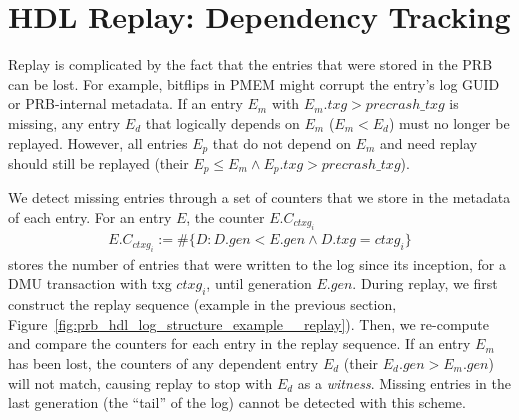 \documentclass[12pt,a4paper,twoside]{book}
\begin{document}
\section{HDL Replay: Dependency Tracking}\label{di:prb:deptrack}
Replay is complicated by the fact that the entries that were stored in the PRB can be lost.
For example, bitflips in PMEM might corrupt the entry's log GUID or PRB-internal metadata.
If an entry $E_m$ with $E_m.txg > precrash\_txg$ is missing, any entry $E_d$ that logically depends on $E_m$ ($E_m < E_d$) must no longer be replayed.
However, all entries $E_p$ that do not depend on $E_m$ and need replay should still be replayed (their $E_p \le E_m \wedge E_p.txg > precrash\_txg$).

We detect missing entries through a set of counters that we store in the metadata of each entry.
For an entry $E$, the counter $E.C_{ctxg_i}$
\begin{gather*}
    E.C_{ctxg_i} := \#\{ D : D.gen < E.gen \wedge D.txg = ctxg_i\}
\end{gather*}
stores the number of entries that were written to the log since its inception, for a DMU transaction with txg $ctxg_i$, until generation $E.gen$.
During replay, we first construct the replay sequence (example in the previous section, Figure~\ref{fig:prb_hdl_log_structure_example__replay}).
Then, we re-compute and compare the counters for each entry in the replay sequence.
If an entry $E_m$ has been lost, the counters of any dependent entry $E_d$ (their $E_d.gen > E_m.gen$) will not match, causing replay to stop with $E_d$ as a \textit{witness}.
Missing entries in the last generation (the ``tail'' of the log) cannot be detected with this scheme.
\end{document}
